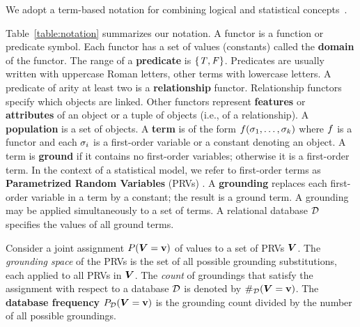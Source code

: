 {%

We adopt a term-based notation for combining logical and statistical concepts~\citep{Poole2003,Kimmig2014}. {Table~\ref{table:notation} summarizes our notation.
A functor is a function or predicate symbol. Each functor has a set of values (constants) called the \textbf{domain} of the functor. The range of a \textbf{predicate} is $\{\mathit{T},\mathit{F}\}$. Predicates are usually written with uppercase Roman letters, other terms with lowercase letters.
A predicate of arity at least two is a \textbf{relationship} functor. Relationship functors specify which objects are linked. Other functors represent \textbf{features} or \textbf{attributes} of an object or a tuple of objects (i.e., of a relationship).
A \textbf{population} is a set of objects. 
A \textbf{term} is of the form $f(\sigma_{1},\ldots,\sigma_{k})$ where $f$ is a functor %
and each $\sigma_{i}$ is a first-order variable or a constant denoting an object. A term is \textbf{ground} if it contains no first-order variables; otherwise it is a first-order term. In the context of a statistical model, we refer to first-order terms as \textbf{Parametrized Random Variables} (PRVs) \citep{Kimmig2014}. 
A \textbf{grounding} replaces each first-order variable in a term by a constant; the result is a ground term. A grounding may be applied simultaneously to a set of terms.  A relational database $\mathcal{D}$ specifies the values of all ground terms. %

Consider a joint assignment 
$P(\boldsymbol{V} = \mathbf{v})$ of values to a set of PRVs $\boldsymbol{V}$. The {\em grounding space} of the PRVs is the set of all possible grounding substitutions, each applied to all PRVs in $\boldsymbol{V}$. The {\em count} of groundings that satisfy the assignment with respect to a database $\mathcal{D}$ is denoted by $\#_{\mathcal{D}}(\boldsymbol{V} = \mathbf{v})$. The \textbf{database frequency} $P_{\mathcal{D}}(\boldsymbol{V} = \mathbf{v})$ is the grounding count divided by the number of all possible groundings. %
 	 	      \begin{table} 
 	 	     

\end{table}}}
